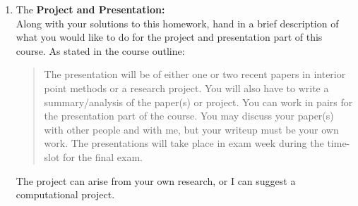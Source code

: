 \documentclass[12pt]{article}
\newcommand{\re}{I \!\! R}
\begin{document}
\begin{enumerate}
\item
    The {\bf Project and Presentation:}  \\
    Along with your solutions to this homework, hand in a brief description of
    what you would like to do for the project and presentation part of this course.
    As stated in the course outline:
    \begin{quote}
    The presentation will be of either one or two recent papers in interior point methods or a research project. You will also have to write a summary/analysis of the paper(s) or project. You can work in pairs for the presentation part of the course. You may discuss your paper(s) with other people and with me, but your writeup must be your own work. The presentations will take place in exam week during the time-slot for the final exam.
    \end{quote}
    The project can arise from your own research, or I can suggest a computational
    project.
\end{enumerate}



\end{document}
